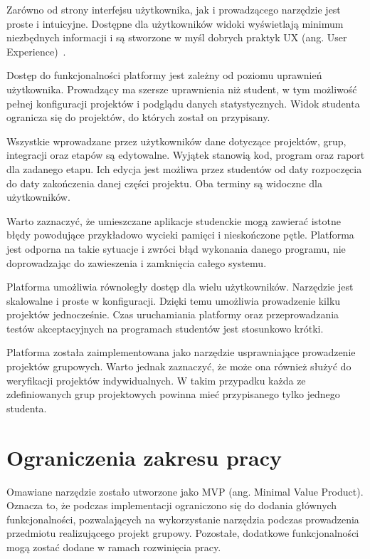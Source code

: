 Zarówno od strony interfejsu użytkownika, jak i prowadzącego narzędzie jest proste i intuicyjne.
Dostępne dla użytkowników widoki wyświetlają minimum niezbędnych informacji i są stworzone w myśl dobrych praktyk UX (ang. User Experience)~\cite{ux-good-practicies}.

Dostęp do funkcjonalności platformy jest zależny od poziomu uprawnień użytkownika.
Prowadzący ma szersze uprawnienia niż student, w tym możliwość pełnej konfiguracji projektów i podglądu danych statystycznych.
Widok studenta ogranicza się do projektów, do których został on przypisany.

Wszystkie wprowadzane przez użytkowników dane dotyczące projektów, grup, integracji oraz etapów są edytowalne.
Wyjątek stanowią kod, program oraz raport dla zadanego etapu.
Ich edycja jest możliwa przez studentów od daty rozpoczęcia do daty zakończenia danej części projektu.
Oba terminy są widoczne dla użytkowników.

Warto zaznaczyć, że umieszczane aplikacje studenckie mogą zawierać istotne błędy powodujące przykładowo wycieki pamięci i nieskończone pętle.
Platforma jest odporna na takie sytuacje i zwróci błąd wykonania danego programu, nie doprowadzając do zawieszenia i zamknięcia całego systemu.

Platforma umożliwia równoległy dostęp dla wielu użytkowników.
Narzędzie jest skalowalne i proste w konfiguracji.
Dzięki temu umożliwia prowadzenie kilku projektów jednocześnie.
Czas uruchamiania platformy oraz przeprowadzania testów akceptacyjnych na programach studentów jest stosunkowo krótki.

Platforma została zaimplementowana jako narzędzie usprawniające prowadzenie projektów grupowych.
Warto jednak zaznaczyć, że może ona również służyć do weryfikacji projektów indywidualnych.
W takim przypadku każda ze zdefiniowanych grup projektowych powinna mieć przypisanego tylko jednego studenta.


\section{Ograniczenia zakresu pracy}

Omawiane narzędzie zostało utworzone jako MVP (ang. Minimal Value Product).
Oznacza to, że podczas implementacji ograniczono się do dodania głównych funkcjonalności, pozwalających na wykorzystanie narzędzia podczas prowadzenia przedmiotu realizującego projekt grupowy.
Pozostałe, dodatkowe funkcjonalności mogą zostać dodane w ramach rozwinięcia pracy.

